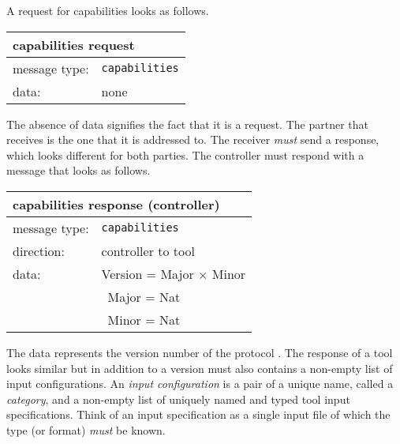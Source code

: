 \documentclass{article}
\newcommand{\msg}[1]{\texttt{#1}}
\begin{document}
   \noindent A request for capabilities looks as follows.
   
   \begin{table}[H]
    \begin{center}
     \begin{tabular}{|ll|}
      \hline
       \multicolumn{2}{|l|}{\textbf{capabilities request}} \\
      \hline
       message type:    & \msg{capabilities} \\
      \hline
       data:            & none \\
      \hline
     \end{tabular}
     \vspace{-0.3cm}
    \end{center}
   \end{table}

   \noindent The absence of data signifies the fact that it is a request. The
   partner that receives is the one that it is addressed to. The receiver
   \emph{must} send a response, which looks different for both parties. The
   controller must respond with a message that looks as follows.

   \begin{table}[H]
    \begin{center}
     \begin{tabular}{|ll|}
      \hline
       \multicolumn{2}{|l|}{\textbf{capabilities response (controller)}} \\
      \hline
       message type:   & \msg{capabilities} \\
      \hline
       direction:      & controller to tool \\
       data:           & Version = Major $\times$ Minor \\
                       & \ Major = Nat \\
                       & \ Minor = Nat \\
      \hline
     \end{tabular}
    \end{center}
    \vspace{-0.3cm}
   \end{table}

   \noindent The data represents the version number of the protocol . The
   response of a tool looks similar but in addition to a version must also
   contains a non-empty list of input configurations. An \textit{input
   configuration} is a pair of a unique name, called a \textit{category}, and a
   non-empty list of uniquely named and typed tool input specifications. Think
   of an input specification as a single input file of which the type (or
   format) \textit{must} be known.
   
\end{document}
